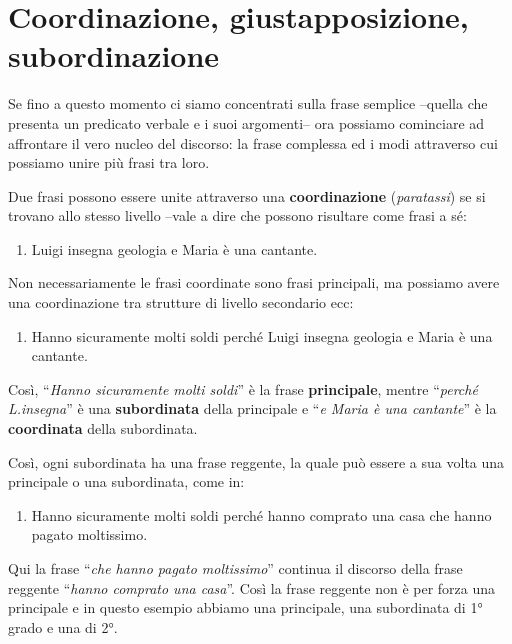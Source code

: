 \documentclass[a4paper,twoside,11pt,chapterprefix=false,bibliography=totocnumbered,listof=flat]{scrbook}
\providecommand{\tightlist}{%
  \setlength{\itemsep}{0pt}\setlength{\parskip}{0pt}}
\begin{document}
\hypertarget{coordinazione-giustapposizione-subordinazione}{%
\section{Coordinazione, giustapposizione, subordinazione}\label{coordinazione-giustapposizione-subordinazione}}

Se fino a questo momento ci siamo concentrati sulla frase semplice --quella che presenta un predicato verbale e i suoi argomenti-- ora possiamo cominciare ad affrontare il vero nucleo del discorso: la frase complessa ed i modi attraverso cui possiamo unire più frasi tra loro.

Due frasi possono essere unite attraverso una \textbf{coordinazione} (\emph{paratassi}) se si trovano allo stesso livello --vale a dire che possono risultare come frasi a sé:

\begin{enumerate}
\def\labelenumi{(\arabic{enumi})}
\setcounter{enumi}{11}
\tightlist
\item
  Luigi insegna geologia e Maria è una cantante.
\end{enumerate}

Non necessariamente le frasi coordinate sono frasi principali, ma possiamo avere una coordinazione tra strutture di livello secondario ecc:

\begin{enumerate}
\def\labelenumi{(\arabic{enumi})}
\setcounter{enumi}{12}
\tightlist
\item
  Hanno sicuramente molti soldi perché Luigi insegna geologia e Maria è una cantante.
\end{enumerate}

Così, \enquote{\emph{Hanno sicuramente molti soldi}} è la frase \textbf{principale}, mentre \enquote{\emph{perché L.insegna}} è una \textbf{subordinata} della principale e \enquote{\emph{e Maria è una cantante}} è la \textbf{coordinata} della subordinata.

Così, ogni subordinata ha una frase reggente, la quale può essere a sua volta una principale o una subordinata, come in:

\begin{enumerate}
\def\labelenumi{(\arabic{enumi})}
\setcounter{enumi}{13}
\tightlist
\item
  Hanno sicuramente molti soldi perché hanno comprato una casa che hanno pagato moltissimo.
\end{enumerate}

Qui la frase \enquote{\emph{che hanno pagato moltissimo}} continua il discorso della frase reggente \enquote{\emph{hanno comprato una casa}}.
Così la frase reggente non è per forza una principale e in questo esempio abbiamo una principale, una subordinata di 1° grado e una di 2°.
\end{document}
